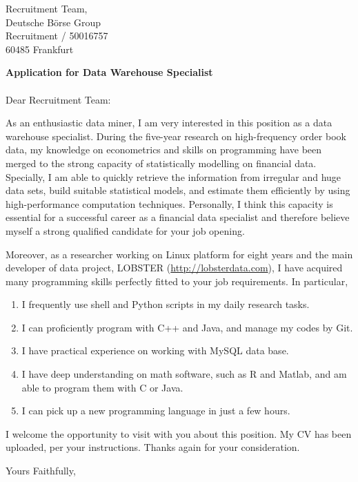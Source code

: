 \documentclass[a4paper, 11pt]{letter}
\begin{document}
 
\begin{letter}{%
Recruitment Team,\\
Deutsche B{\"o}rse Group\\
Recruitment / 50016757 \\
60485 Frankfurt} 
\opening{\textbf{\large{Application for Data Warehouse Specialist}}\\
\vspace{-5pt}\\ Dear Recruitment Team:}
As an enthusiastic data miner, I am very interested in this position as a data warehouse specialist. During the five-year research on high-frequency order book data, my knowledge on econometrics and skills on programming have been merged to the strong capacity of statistically modelling on financial data. Specially, I am able to quickly retrieve the information from irregular and huge data sets, build suitable statistical models, and estimate them efficiently by using high-performance computation techniques. Personally, I think this capacity is essential for a successful career as a financial data specialist and therefore believe myself a strong qualified candidate for your job opening.     

Moreover, as a researcher working on Linux platform for eight years and the main developer of data project, LOBSTER (\url{http://lobsterdata.com}), I have acquired many programming skills perfectly fitted to your job requirements. In particular, 
\begin{enumerate}
  \item I frequently use shell and Python scripts in my daily research tasks.
  \item I can proficiently program with C++ and Java, and manage my codes by Git.
  \item I have practical experience on working with MySQL data base.
  \item I have deep understanding on math software, such as R and Matlab, and am able to program them with C or Java.
  \item I can pick up a new programming language in just a few hours.
\end{enumerate}
I welcome the opportunity to visit with you about this position. My CV has been uploaded, per your instructions. Thanks again for your consideration.
 
\closing{Yours Faithfully,}
 
 
\end{letter}
 
\end{document}
